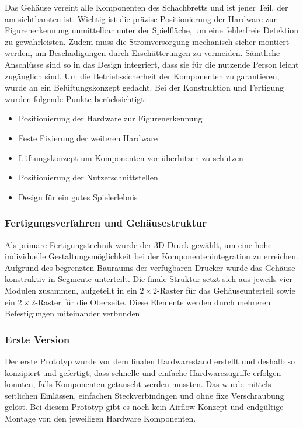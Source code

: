 Das Gehäuse vereint alle Komponenten des Schachbretts und ist jener Teil, der am sichtbarsten ist. Wichtig ist die präzise Positionierung der Hardware zur Figurenerkennung unmittelbar unter der Spielfläche, um eine fehlerfreie Detektion zu gewährleisten. Zudem muss die Stromversorgung mechanisch sicher montiert werden, um Beschädigungen durch Erschütterungen zu vermeiden. Sämtliche Anschlüsse sind so in das Design integriert, dass sie für die nutzende Person leicht zugänglich sind. Um die Betriebssicherheit der Komponenten zu garantieren, wurde an ein Belüftungskonzept gedacht.
\newline
\newline
Bei der Konstruktion und Fertigung wurden folgende Punkte berücksichtigt:

\begin{itemize}
    \item Positionierung der Hardware zur Figurenerkennung
    \item Feste Fixierung der weiteren Hardware
    \item Lüftungskonzept um Komponenten vor überhitzen zu schützen
    \item Positionierung der Nutzerschnittstellen
    \item Design für ein gutes Spielerlebnis
\end{itemize}

\subsubsection{Fertigungsverfahren und Gehäusestruktur}
Als primäre Fertigungstechnik wurde der 3D-Druck gewählt, um eine hohe individuelle Gestaltungsmöglichkeit bei der Komponentenintegration zu erreichen. Aufgrund des begrenzten Bauraums der verfügbaren Drucker wurde das Gehäuse konstruktiv in Segmente unterteilt. Die finale Struktur setzt sich aus jeweils vier Modulen zusammen, aufgeteilt in ein $2 \times 2$-Raster für das Gehäuseunterteil sowie ein $2 \times 2$-Raster für die Oberseite. Diese Elemente werden durch mehreren Befestigungen miteinander verbunden.
\newpage

\subsubsection{Erste Version}

Der erste Prototyp wurde vor dem finalen Hardwarestand erstellt und deshalb so konzipiert und gefertigt, dass schnelle und einfache Hardwarezugriffe erfolgen konnten, falls Komponenten getauscht werden mussten. Das wurde mittels seitlichen Einlässen, einfachen Steckverbindngen und ohne fixe Verschraubung gelöst. Bei diesem Prototyp gibt es noch kein Airflow Konzept und endgültige Montage von den jeweiligen Hardware Komponenten.


